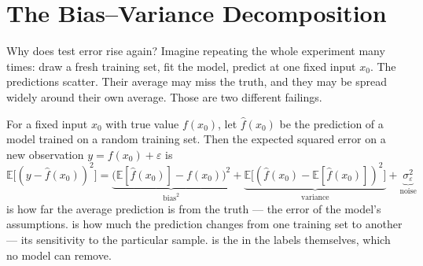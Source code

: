 \section{The Bias--Variance Decomposition}

Why does test error rise again? Imagine repeating the whole experiment many
times: draw a fresh training set, fit the model, predict at one fixed input
$x_0$. The predictions scatter. Their average may miss the truth, and they may be
spread widely around their own average. Those are two different failings.

\begin{definitionbox}
For a fixed input $x_0$ with true value $f(x_0)$, let $\hat{f}(x_0)$ be the
prediction of a model trained on a random training set. Then the expected squared
error on a new observation $y = f(x_0) + \varepsilon$ is
\[
\mathbb{E}\big[(y - \hat{f}(x_0))^2\big]
= \underbrace{\big(\mathbb{E}[\hat{f}(x_0)] - f(x_0)\big)^2}_{\text{bias}^2}
+ \underbrace{\mathbb{E}\big[(\hat{f}(x_0) - \mathbb{E}[\hat{f}(x_0)])^2\big]}_{\text{variance}}
+ \underbrace{\sigma^2_{\varepsilon}}_{\text{noise}}
\]
 is how far the average prediction is from the truth --- the error of
the model's assumptions.  is how much the prediction changes from
one training set to another --- its sensitivity to the particular sample.
 is the  in the labels themselves, which no
model can remove.
\end{definitionbox}

